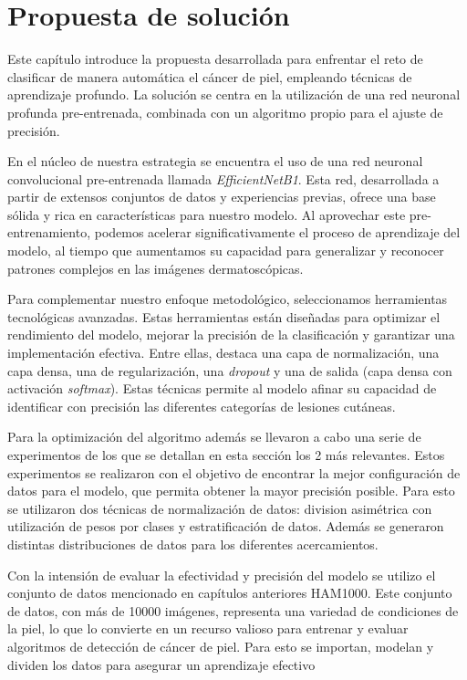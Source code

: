 \chapter{Propuesta de solución}\label{chapter:proposal}

Este capítulo introduce la propuesta desarrollada para enfrentar el reto de clasificar de manera automática el cáncer de piel, empleando técnicas de aprendizaje profundo. La solución se centra en la utilización de una red neuronal profunda pre-entrenada, combinada con un algoritmo propio para el ajuste de precisión.

En el núcleo de nuestra estrategia se encuentra el uso de una red neuronal convolucional pre-entrenada llamada \textit{EfficientNetB1}. Esta red, desarrollada a partir de extensos conjuntos de datos y experiencias previas, ofrece una base sólida y rica en características para nuestro modelo. Al aprovechar este pre-entrenamiento, podemos acelerar significativamente el proceso de aprendizaje del modelo, al tiempo que aumentamos su capacidad para generalizar y reconocer patrones complejos en las imágenes dermatoscópicas.

Para complementar nuestro enfoque metodológico, seleccionamos herramientas tecnológicas avanzadas. Estas herramientas están diseñadas para optimizar el rendimiento del modelo, mejorar la precisión de la clasificación y garantizar una implementación efectiva. Entre ellas, destaca una capa de normalización, una capa densa, una de regularización, una \textit{dropout} y una de salida (capa densa con activación \textit{softmax}). Estas técnicas permite al modelo afinar su capacidad de identificar con precisión las diferentes categorías de lesiones cutáneas.

Para la optimización del algoritmo además se llevaron a cabo una serie de experimentos de los que se detallan en esta sección los 2 más relevantes. Estos experimentos se realizaron con el objetivo de encontrar la mejor configuración de datos para el modelo, que permita obtener la mayor precisión posible. Para esto se utilizaron dos técnicas de normalización de datos: division asimétrica con utilización de pesos por clases y estratificación de datos. Además se generaron distintas distribuciones de datos para los diferentes acercamientos.

Con la intensión de evaluar la efectividad y precisión del modelo se utilizo el conjunto de datos mencionado en capítulos anteriores HAM1000. Este conjunto de datos, con más de 10000 imágenes, representa una variedad de condiciones de la piel, lo que lo convierte en un recurso valioso para entrenar y evaluar algoritmos de detección de cáncer de piel. Para esto se importan, modelan y dividen los datos para asegurar un aprendizaje efectivo

